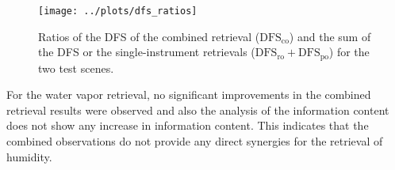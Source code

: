 \documentclass[journal abbreviation, manuscript]{copernicus}
\begin{document}
\begin{figure}
  \centering
  \texttt{[image: ../plots/dfs\_ratios]}
  \caption{Ratios of the DFS of the combined retrieval ($\text{DFS}_\text{co}$) and
    the sum of the DFS or the single-instrument retrievals ($\text{DFS}_\text{ro} + \text{DFS}_\text{po}$)
    for the two test scenes.}
  \label{fig:dfs_ratios}
\end{figure}

For the water vapor retrieval, no significant improvements in the combined
retrieval results were observed and also the analysis of the information content
does not show any increase in information content. This indicates that the
combined observations do not provide any direct synergies for the retrieval of
humidity.

%
%
%
\end{document}
